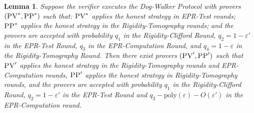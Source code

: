 \documentclass[11pt]{article}
\newtheorem{lemma}[theorem]{Lemma}
\theoremstyle{remark}
\theoremstyle{definition}
\newcommand{\eps}{\varepsilon}
\newcommand{\pv}{\textsc{PV}}
\newcommand{\pp}{\textsc{PP}}
\begin{document}
\begin{lemma}\label{lem:PV-34}
Suppose the verifier executes the Dog-Walker Protocol with provers $(\pv^*,\pp^*)$ such that: $\pv^*$ applies the honest strategy in EPR-Test rounds; 
$\pp^*$ applies the honest strategy in the Rigidity-Tomography rounds; and the provers are accepted with probability $q_1$ in the Rigidity-Clifford Round, $q_2 = 1-\eps'$ in the EPR-Test Round, $q_3$ in the EPR-Computation Round, and $q_4=1-\eps$ in the Rigidity-Tomography Round. Then there exist provers $(\pv',\pp')$ such that $\pv'$ applies the honest strategy in the Rigidity-Tomography rounds and EPR-Computation rounds, $\pp'$ applies the honest strategy in Rigidity-Tomography rounds, and
the provers are accepted with probability $q_1$ in the Rigidity-Clifford Round, $q_2 = 1-\eps'$ in the EPR-Test Round and $q_3-\mathrm{poly}(\eps)-O(\eps')$ in the EPR-Computation round. 
\end{lemma}
\end{document}
